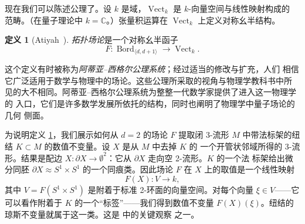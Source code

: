 \documentclass[11pt]{amsart}
\theoremstyle{definition}
\newtheorem{definition}[equation]{定义}
\theoremstyle{remark}
\theoremstyle{plain}
\numberwithin{equation}{section}
\renewcommand{\:}{\colon}
\newcommand{\CC}{{\mathbb C}}
\newcommand{\cir}{S^1}
\DeclareMathOperator{\Bord}{Bord}
\DeclareMathOperator{\Vect}{Vect}
\newcommand{\Bd}{\Bord_{\langle d,d+1  \rangle}}
\newcommand{\Vk}{\Vect_k}
\begin{document}
现在我们可以陈述公理了。设 $k$ 是域，$\Vk$ 是 $k$-向量空间与线性映射构成的
范畴。（在量子理论中 $k=\CC$。）张量积运算在 $\Vk$ 上定义对称幺半结构。


   \begin{definition}[Atiyah~\cite{A11}]\label{thm:31}
  \emph{拓扑场论}是一个对称幺半函子
  \begin{equation}\label{eq:125}
     F\:\Bd\longrightarrow \Vk. 
  \end{equation}
   \end{definition}


\noindent
这个定义有时被称为\emph{阿蒂亚–西格尔公理系统}；经过适当的修改与扩充，人们
相信它广泛适用于数学与物理中的场论。这些公理所采取的视角与物理学教科书中所
见的大不相同。阿蒂亚–西格尔公理系统为整整一代数学家提供了进入这一物理学的
入口，它们是许多数学发展所依托的结构，同时也阐明了物理学中量子场论的几何
侧面。


为说明定义 \ref{thm:31}，我们展示如何从 $d=2$ 的场论 $F$ 提取闭 3-流形 $M$
中带法标架的纽结 $K\subset M$ 的数值不变量。设 $X$ 是从 $M$ 中去掉 $K$ 的
一个开管状邻域所得的 3-流形。结果是配边
$X\:\partial X\to \emptyset ^2$：它从 $\partial X$ 走向空 2-流形。$K$ 的一个法
标架给出微分同胚 $\partial X\approx\cir\times \cir$ 的一个同痕类。因此场论
$F$ 在 $X$ 上的取值是一个线性映射
  \begin{equation}\label{eq:126}
     F(X)\:V\longrightarrow k, 
  \end{equation}
其中 $V=F(\cir\times \cir)$ 是附着于标准 2-环面的向量空间。对每个向量
$\xi \in V$——它可以看作附着于 $K$ 的一个“标签”——我们得到数值不变量
$F(X)(\xi )$。纽结的琼斯不变量就属于这一类。这是 \cite{Wi4} 中的关键观察
之一。
\end{document}
